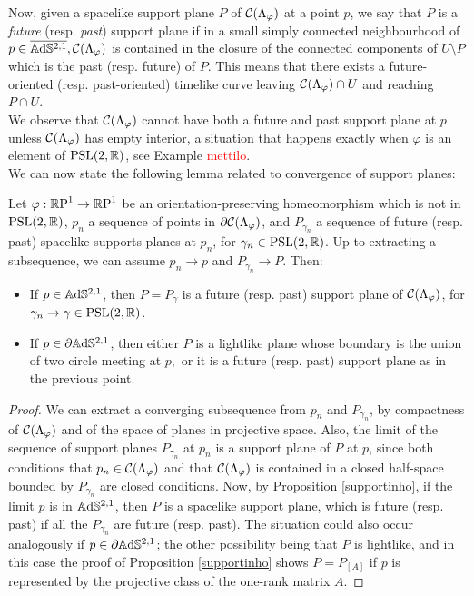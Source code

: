 Now, given a spacelike support plane $P$ of $\CF$ at a point $p$, we say that $P$ is a \textit{future} (resp. \textit{past}) support plane if in a small simply connected neighbourhood of $p\in\overline{\A^{2,1}}, \CF$ is contained in the closure of the connected components of $U\setminus P$ which is the past (resp. future) of $P$. This means that there exists a future-oriented (resp. past-oriented) timelike curve leaving $\CF\cap U$ and reaching $P\cap U$. \\
We observe that $\CF$ cannot have both a future and past support plane at $p$ unless $\CF$ has empty interior, a situation that happens exactly when $\varphi$ is an element of $\PSL$, see Example \textcolor{red}{mettilo}.\\
We can now state the following lemma related to convergence of support planes: 
\begin{lemma}\label{49}
    Let $\varphi:\S\to\S$ be an orientation-preserving homeomorphism which is not in $\PSL$, $p_n$ a sequence of points in $\partial\CF$, and $P_{\gamma_n}$ a sequence of future (resp. past) spacelike supports planes at $p_n$, for $\gamma_n\in\PSL$. Up to extracting a subsequence, we can assume $p_n\to p$ and $P_{\gamma_n}\to P.$ Then: 
    \begin{itemize}
        \item If $p\in\A^{2,1}$, then $P=P_\gamma$ is a future (resp. past) support plane of $\CF$, for $\gamma_n\to\gamma\in\PSL$.
        \item If $p\in\partial\A^{2,1}$, then either $P$ is a lightlike plane whose boundary is the union of two circle meeting at $p,$ or it is a future (resp. past) support plane as in the previous point.        
    \end{itemize}
\end{lemma}
\begin{proof}
We can extract a converging subsequence from $p_{n}$ and $P_{\gamma_n}$, by compactness of $\CF$ and of the space of planes in projective space. Also, the limit of the sequence of support planes $P_{\gamma_n}$ at $p_n$ is a support plane of $P$ at $p$, since both conditions that $p_n\in\CF$ and that $\CF$ is contained in a closed half-space bounded by $P_{\gamma_n}$ are closed conditions. Now, by Proposition \ref{supportinho}, if the limit $p$ is in $\A^{2,1}$, then $P$ is a spacelike support plane, which is future (resp. past) if all the $P_{\gamma_n}$ are future (resp. past). The situation could also occur analogously if $p\in\partial\A^{2,1}$; the other possibility being that $P$ is lightlike, and in this case the proof of Proposition \ref{supportinho} shows $P=P_{[A]}$ if $p$ is represented by the projective class of the one-rank matrix $A$.
\end{proof}
